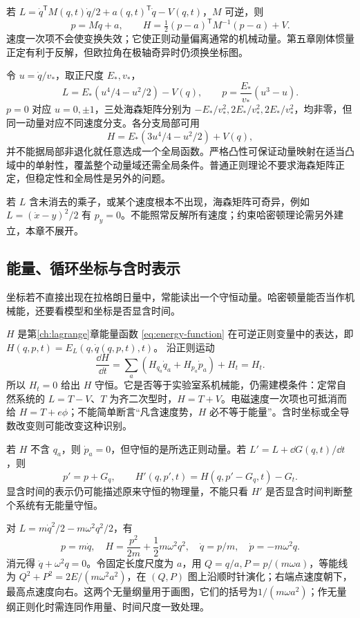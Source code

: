 若 $L=\dot q^{\mathsf T}M(q,t)\dot q/2+a(q,t)^{\mathsf T}\dot q-V(q,t)$，$M$ 可逆，则
\[
p=M\dot q+a,\qquad
H=\tfrac12(p-a)^{\mathsf T}M^{-1}(p-a)+V.
\]
速度一次项不会使变换失效；它使正则动量偏离通常的机械动量。第五章刚体惯量正定有利于反解，但欧拉角在极轴奇异时仍须换坐标图。

\begin{example}[非退化不等于全局单值]
令 $u=\dot q/v_*$，取正尺度 $E_*,v_*$，
\[
L=E_*(u^4/4-u^2/2)-V(q),\qquad
p=\frac{E_*}{v_*}(u^3-u).
\]
$p=0$ 对应 $u=0,\pm1$，三处海森矩阵分别为 $-E_*/v_*^2,2E_*/v_*^2,2E_*/v_*^2$，均非零，但同一动量对应不同速度分支。各分支局部可用
\[
H=E_*(3u^4/4-u^2/2)+V(q),
\]
并不能据局部非退化就任意选成一个全局函数。严格凸性可保证动量映射在适当凸域中的单射性，覆盖整个动量域还需全局条件。普通正则理论不要求海森矩阵正定，但稳定性和全局性是另外的问题。
\end{example}

若 $L$ 含未消去的乘子，或某个速度根本不出现，海森矩阵可奇异，例如 $L=(\dot x-y)^2/2$ 有 $p_y=0$。不能照常反解所有速度；约束哈密顿理论需另外建立，本章不展开。

\subsection{能量、循环坐标与含时表示}
坐标若不直接出现在拉格朗日量中，常能读出一个守恒动量。哈密顿量能否当作机械能，还要看模型和坐标是否显含时间。

$H$ 是第\ref{ch:lagrange}章能量函数 \eqref{eq:energy-function} 在可逆正则变量中的表达，即 $H(q,p,t)=E_L(q,\dot q(q,p,t),t)$。
沿正则运动
\begin{equation}
\frac{\dd H}{\dd t}=\sum_a(H_{q_a}\dot q_a+H_{p_a}\dot p_a)+H_t=H_t.
\label{eq:hamiltonian-conserved}
\end{equation}
所以 $H_t=0$ 给出 $H$ 守恒。它是否等于实验室系机械能，仍需建模条件：定常自然系统的 $L=T-V$、$T$ 为齐二次型时，$H=T+V$。电磁速度一次项也可抵消而给 $H=T+e\phi$；不能简单断言“凡含速度势，$H$ 必不等于能量”。含时坐标或全导数改变则可能改变这种识别。

若 $H$ 不含 $q_a$，则 $\dot p_a=0$，但守恒的是所选正则动量。若 $L'=L+\dd G(q,t)/\dd t$，则
\[
p'=p+G_q,\qquad
H'(q,p',t)=H(q,p'-G_q,t)-G_t.
\]
显含时间的表示仍可能描述原来守恒的物理量，不能只看 $H'$ 是否显含时间判断整个系统有无能量守恒。

\begin{example}
对 $L=m\dot q^2/2-m\omega^2q^2/2$，有
\[
p=m\dot q,\quad H=\frac{p^2}{2m}+\frac12m\omega^2q^2,
\quad \dot q=p/m,\quad\dot p=-m\omega^2q.
\]
消元得 $\ddot q+\omega^2q=0$。令固定长度尺度为 $a$，用 $Q=q/a,P=p/(m\omega a)$，等能线为 $Q^2+P^2=2E/(m\omega^2a^2)$，在 $(Q,P)$ 图上沿顺时针演化；右端点速度朝下，最高点速度向右。这两个无量纲量用于画图，它们的括号为$1/(m\omega a^2)$；作无量纲正则化时需连同作用量、时间尺度一致处理。
\end{example}

